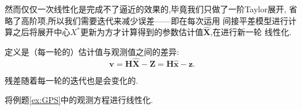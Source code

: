 \documentclass[cn,10pt,citestyle=gb7714-2015,bibstyle=gb7714-2015]{elegantbook}
\begin{document}
然而仅仅一次线性化是完成不了逼近的效果的,毕竟我们只做了一阶\textup{Taylor}展开,
省略了高阶项,所以我们需要\colorbox{yellow!20}{迭代}来减少误差——即在每次运用
间接平差模型进行计算之后将展开中心$X^*$更新为方才计算得到的参数估计值$\hat{\bm{X}}$,在进行新一轮
线性化.
\begin{definition}[残差]\label{def:residual-adjustment}
  定义是（每一轮的）估计值与观测值之间的差异:
  \begin{equation}\label{eq:residual-adjustment}
    \bm{v}=\bm{H}\hat{\bm{X}}-\bm{Z}=\bm{H}\hat{\bm{x}}-\bm{z}.
  \end{equation}
\end{definition}
\begin{note}
  残差随着每一轮的迭代也是会变化的.
\end{note}
\begin{example}
  将例题\ref{ex:GPS}中的观测方程进行线性化.
\end{example}
\end{document}

